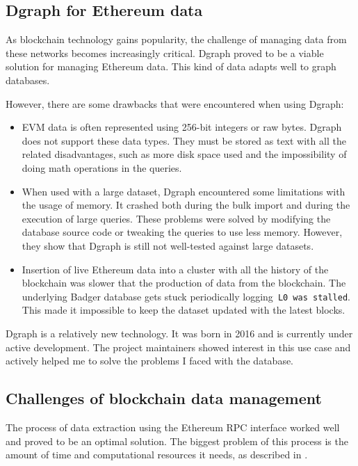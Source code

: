 \label{chapter-discussion}

\subsection{Dgraph for Ethereum data}

As blockchain technology gains popularity, the challenge of managing data from these networks becomes increasingly critical. Dgraph proved to be a viable solution for managing Ethereum data. This kind of data adapts well to graph databases. 

However, there are some drawbacks that were encountered when using Dgraph:

\begin{itemize}
    \item EVM data is often represented using 256-bit integers or raw bytes. Dgraph does not support these data types. They must be stored as text with all the related disadvantages, such as more disk space used and the impossibility of doing math operations in the queries.
    \item When used with a large dataset, Dgraph encountered some limitations with the usage of memory. It crashed both during the bulk import and during the execution of large queries. These problems were solved by modifying the database source code or tweaking the queries to use less memory. However, they show that Dgraph is still not well-tested against large datasets.
    \item Insertion of live Ethereum data into a cluster with all the history of the blockchain was slower that the production of data from the blockchain. The underlying Badger database gets stuck periodically logging~{\tt L0 was stalled}. This made it impossible to keep the dataset updated with the latest blocks. 
\end{itemize}

Dgraph is a relatively new technology. It was born in 2016 and is currently under active development. The project maintainers showed interest in this use case and actively helped me to solve the problems I faced with the database.

\subsection{Challenges of blockchain data management}

The process of data extraction using the Ethereum RPC interface worked well and proved to be an optimal solution. The biggest problem of this process is the amount of time and computational resources it needs, as described in .

